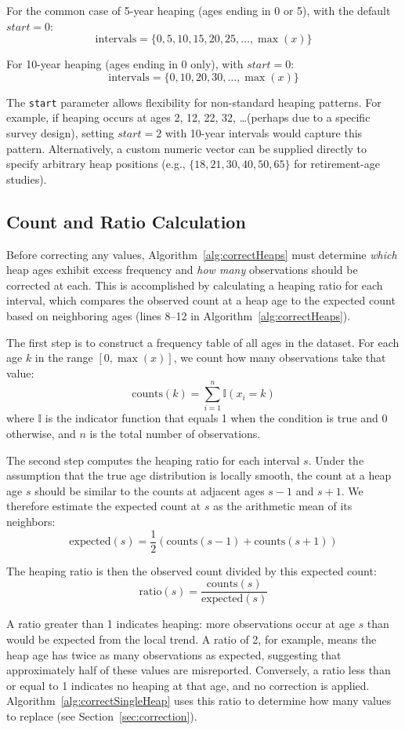 \documentclass[pdflatex,sn-mathphys-num]{sn-jnl}%
\theoremstyle{thmstyleone}%
\theoremstyle{thmstyletwo}%
\theoremstyle{thmstylethree}%
\begin{document}
For the common case of 5-year heaping (ages ending in 0 or 5), with the default $start = 0$:
\[
\text{intervals} = \{0, 5, 10, 15, 20, 25, \ldots, \max(x)\}
\]

For 10-year heaping (ages ending in 0 only), with $start = 0$:
\[
\text{intervals} = \{0, 10, 20, 30, \ldots, \max(x)\}
\]

The \texttt{start} parameter allows flexibility for non-standard heaping patterns. For example, if heaping occurs at ages 2, 12, 22, 32, \ldots (perhaps due to a specific survey design), setting $start = 2$ with 10-year intervals would capture this pattern. Alternatively, a custom numeric vector can be supplied directly to specify arbitrary heap positions (e.g., $\{18, 21, 30, 40, 50, 65\}$ for retirement-age studies).

\subsection{Count and Ratio Calculation}

Before correcting any values, Algorithm~\ref{alg:correctHeaps} must determine \emph{which} heap ages exhibit excess frequency and \emph{how many} observations should be corrected at each. This is accomplished by calculating a heaping ratio for each interval, which compares the observed count at a heap age to the expected count based on neighboring ages (lines 8--12 in Algorithm~\ref{alg:correctHeaps}).

The first step is to construct a frequency table of all ages in the dataset. For each age $k$ in the range $[0, \max(x)]$, we count how many observations take that value:
\[
\text{counts}(k) = \sum_{i=1}^{n} \mathbb{I}(x_i = k)
\]
where $\mathbb{I}$ is the indicator function that equals 1 when the condition is true and 0 otherwise, and $n$ is the total number of observations.

The second step computes the heaping ratio for each interval $s$. Under the assumption that the true age distribution is locally smooth, the count at a heap age $s$ should be similar to the counts at adjacent ages $s-1$ and $s+1$. We therefore estimate the expected count at $s$ as the arithmetic mean of its neighbors:
\[
\text{expected}(s) = \frac{1}{2} \left( \text{counts}(s-1) + \text{counts}(s+1) \right)
\]

The heaping ratio is then the observed count divided by this expected count:
\[
\text{ratio}(s) = \frac{\text{counts}(s)}{\text{expected}(s)}
\]

A ratio greater than 1 indicates heaping: more observations occur at age $s$ than would be expected from the local trend. A ratio of 2, for example, means the heap age has twice as many observations as expected, suggesting that approximately half of these values are misreported. Conversely, a ratio less than or equal to 1 indicates no heaping at that age, and no correction is applied. Algorithm~\ref{alg:correctSingleHeap} uses this ratio to determine how many values to replace (see Section~\ref{sec:correction}).
\end{document}

